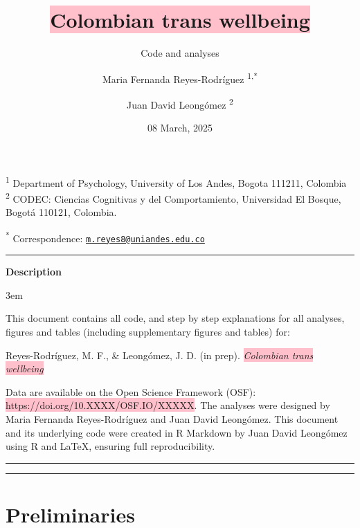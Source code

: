\documentclass[
  bookmarksnumbered]{article}
\title{\colorbox{pink}{Colombian trans wellbeing}}
\subtitle{Code and analyses}
\author{Maria Fernanda Reyes-Rodríguez \orcidlink{0000-0002-2645-5092}\textsuperscript{1,*} \and Juan David Leongómez \orcidlink{0000-0002-0092-6298}\textsuperscript{2}}
\date{08 March, 2025}
\begin{document}
\maketitle

\textsuperscript{1} Department of Psychology, University of Los Andes, Bogota 111211, Colombia\\
\textsuperscript{2} CODEC: Ciencias Cognitivas y del Comportamiento, Universidad El Bosque, Bogotá 110121, Colombia.

\textsuperscript{*} Correspondence: \href{mailto:m.reyes8@uniandes.edu.co}{\href{mailto:m.reyes8@uniandes.edu.co}{\nolinkurl{m.reyes8@uniandes.edu.co}}}

\begin{center}\rule{0.5\linewidth}{0.5pt}\end{center}

\begin{center}
\textbf{Description}
\end{center}

\par
\begingroup
\leftskip3em
\rightskip\leftskip

This document contains all code, and step by step explanations for all analyses, figures and tables (including supplementary figures and tables) for:

\begin{hangparas}{.25in}{1}
Reyes-Rodríguez, M. F., \&  Leongómez, J. D. (in prep). \textit{\colorbox{pink}{Colombian trans wellbeing}}
\end{hangparas}

Data are available on the Open Science Framework (OSF): \colorbox{pink}{https://doi.org/10.XXXX/OSF.IO/XXXXX}. The analyses were designed by Maria Fernanda Reyes-Rodríguez and Juan David Leongómez. This document and its underlying code were created in R Markdown by Juan David Leongómez using R and \LaTeX, ensuring full reproducibility.

\begin{center}\rule{0.5\linewidth}{0.5pt}\end{center}

\par
\endgroup

{\hypersetup{hidelinks}
\setcounter{tocdepth}{6}
\tableofcontents
}
\opensupplement

\begin{center}\rule{0.5\linewidth}{0.5pt}\end{center}

\section{Preliminaries}\label{preliminaries}
\end{document}
